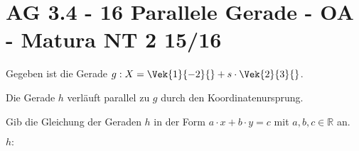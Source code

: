 \section{AG 3.4 - 16 Parallele Gerade - OA - Matura NT 2 15/16}

\begin{beispiel}[AG 3.4]{1} %
Gegeben ist die Gerade $g:X=\Vek{1}{-2}{}+s\cdot\Vek{2}{3}{}$.

Die Gerade $h$ verläuft parallel zu $g$ durch den Koordinatenursprung.

Gib die Gleichung der Geraden $h$ in der Form $a\cdot x+b\cdot y=c$ mit $a,b,c\in\mathbb{R}$ an.

$h:$ 
\end{beispiel}